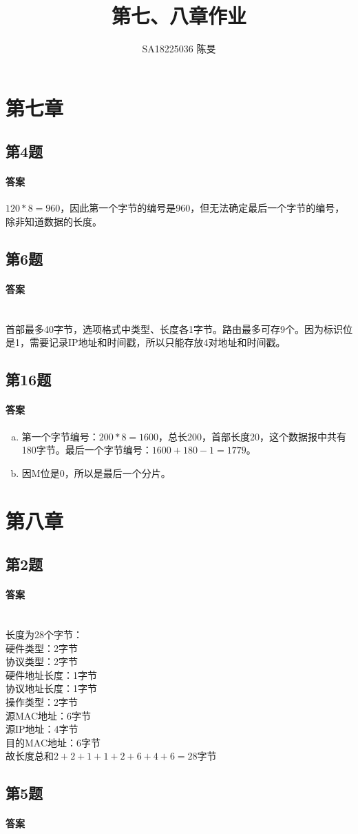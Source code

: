 \documentclass[UTF8]{article}
\title{第七、八章作业}
\author{SA18225036 陈旻}
\begin{document}
\date{}
\maketitle
\section{第七章}
\subsection{第4题}
\paragraph{答案}
$ 120*8=960 $，因此第一个字节的编号是960，但无法确定最后一个字节的编号，除非知道数据的长度。
\subsection{第6题}
\paragraph{答案}
~\\
首部最多40字节，选项格式中类型、长度各1字节。路由最多可存9个。因为标识位是1，需要记录IP地址和时间戳，所以只能存放4对地址和时间戳。
\subsection{第16题}
\paragraph{答案}
\begin{enumerate}[a.]
    \item 第一个字节编号：$ 200*8=1600 $，总长200，首部长度20，这个数据报中共有180字节。最后一个字节编号：$ 1600+180-1=1779 $。
    \item 因M位是0，所以是最后一个分片。
\end{enumerate}
\section{第八章}
\subsection{第2题}
\paragraph{答案}
~\\
长度为28个字节：  \\
硬件类型：2字节 \\
协议类型：2字节 \\
硬件地址长度：1字节 \\
协议地址长度：1字节 \\
操作类型：2字节 \\
源MAC地址：6字节 \\
源IP地址：4字节 \\
目的MAC地址：6字节 \\
故长度总和$ 2+2+1+1+2+6+4+6=28 $字节
\subsection{第5题}
\paragraph{答案}
\end{document}
